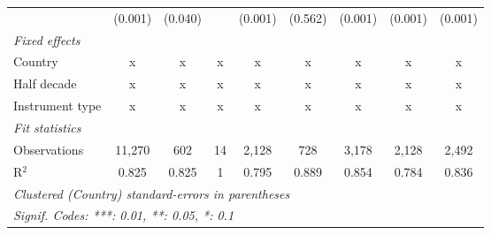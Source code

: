 \begin{table}[htbp]
\begin{tabular}{lcccccccc}
                                                                    & (0.001)       & (0.040)                   &              & (0.001)        & (0.562)          & (0.001)         & (0.001)         & (0.001)\\   
      \emph{Fixed effects}\\
      Country                                                       & x             & x                         & x            & x              & x                & x               & x               & x\\  
      Half decade                                                   & x             & x                         & x            & x              & x                & x               & x               & x\\  
      Instrument type                                               & x             & x                         & x            & x              & x                & x               & x               & x\\  
      \midrule \emph{Fit statistics}\\
      Observations                                                  & 11,270        & 602                       & 14           & 2,128          & 728              & 3,178           & 2,128           & 2,492\\  
      R$^2$                                                         & 0.825         & 0.825                     & 1            & 0.795          & 0.889            & 0.854           & 0.784           & 0.836\\  
      \midrule
      \multicolumn{9}{l}{\emph{Clustered (Country) standard-errors in parentheses}}\\
      \multicolumn{9}{l}{\emph{Signif. Codes: ***: 0.01, **: 0.05, *: 0.1}}\\
   \end{tabular}
\end{table}


